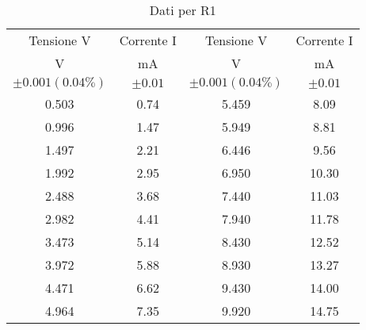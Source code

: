 \begin{table}[H]
    \centering
    \begin{tabular}{|c|c||c|c|}
    \hline
        Tensione V 	&	Corrente I & Tensione V   &   Corrente I 	\\
        V	&	mA      & V &   mA	\\
        $\pm 0.001 (0.04\%)$	&	$\pm 0.01 $ & $\pm 0.001 (0.04\%)$   &   $\pm 0.01 $	\\ \hline
        0.503	&	0.74	&  5.459   &   8.09    \\
        0.996	&	1.47	&  5.949   &   8.81    \\
        1.497	&	2.21	&  6.446   &   9.56    \\
        1.992	&	2.95	&  6.950   &   10.30   \\
        2.488	&	3.68	&  7.440   &   11.03   \\
        2.982	&	4.41	&  7.940   &   11.78   \\
        3.473	&	5.14	&  8.430   &   12.52   \\
        3.972	&	5.88	&  8.930   &   13.27   \\
        4.471	&	6.62	&  9.430   &   14.00   \\
        4.964	&	7.35	&  9.920   &   14.75   \\ \hline
    \end{tabular}
    \caption{Dati per R1}
    \label{tab:R1_ohm}
\end{table}